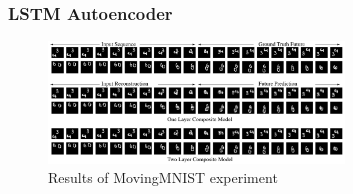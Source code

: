   \begin{frame}
   \frametitle{LSTM Autoencoder}  
  
   \begin{figure}[H]
    \includegraphics[width=0.7\textwidth]{../Images/srivastava_results_mnist.png}
    \centering
    \caption{Results of MovingMNIST experiment \citep{Srivastava2015}}
    \label{fig:lstm_results_mnist}
   \end{figure}
  
  \end{frame}
 
